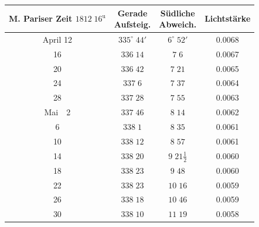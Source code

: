 \begin{center}
\fontsize{10}{12}\selectfont\setlength{\tabcolsep}{3pt}\renewcommand{\arraystretch}{1.15}\begin{tabular}{c|c|c|c}
\shortstack{M. Pariser Zeit\\$1812\;16^{\mathrm u}$} & \shortstack{Gerade\\Aufsteig.} & \shortstack{Südliche\\Abweich.} & Lichtstärke \\
\hline
April 12 & $335^\circ\;44'$ & $6^\circ\;52'$ & 0.0068 \\
16 & $336\;14$ & $7\;6$ & 0.0067 \\
20 & $336\;42$ & $7\;21$ & 0.0065 \\
24 & $337\;6$ & $7\;37$ & 0.0064 \\
28 & $337\;28$ & $7\;55$ & 0.0063 \\
Mai\ \ 2 & $337\;46$ & $8\;14$ & 0.0062 \\
6 & $338\;1$ & $8\;35$ & 0.0061 \\
10 & $338\;12$ & $8\;57$ & 0.0061 \\
14 & $338\;20$ & $9\;21\tfrac{1}{2}$ & 0.0060 \\
18 & $338\;23$ & $9\;48$ & 0.0060 \\
22 & $338\;23$ & $10\;16$ & 0.0059 \\
26 & $338\;18$ & $10\;46$ & 0.0059 \\
30 & $338\;10$ & $11\;19$ & 0.0058 \\
\end{tabular}
\end{center}
